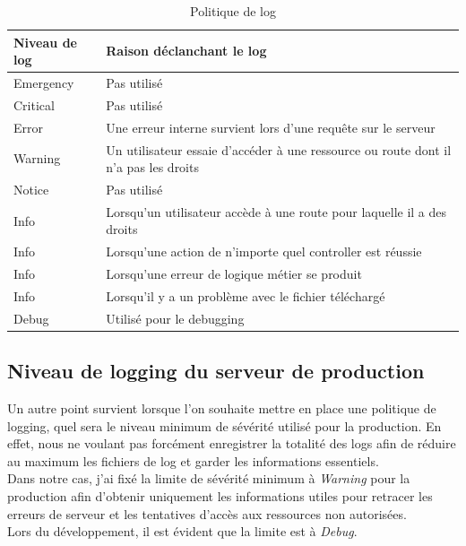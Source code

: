 \documentclass[
    iai, %
    il, %
]{heig-tb}
\begin{document}
\begin{table}[h]
    \begin{center}
        \caption{Politique de log\label{politique-log}}
        \begin{tabularx}{1.0\textwidth} {l|X}
            Niveau de log & Raison déclanchant le log                                                           \\ \hline
            Emergency     & Pas utilisé                                                                         \\
            Critical      & Pas utilisé                                                                         \\
            Error         & Une erreur interne survient lors d'une requête sur le serveur                       \\
            Warning       & Un utilisateur essaie d'accéder à une ressource ou route dont il n'a pas les droits \\
            Notice        & Pas utilisé                                                                         \\
            Info          & Lorsqu'un utilisateur accède à une route pour laquelle il a des droits              \\
            Info          & Lorsqu'une action de n'importe quel controller est réussie                          \\
            Info          & Lorsqu'une erreur de logique métier se produit                                      \\
            Info          & Lorsqu'il y a un problème avec le fichier téléchargé                                \\
            Debug         & Utilisé pour le debugging                                                           \\
        \end{tabularx}
    \end{center}
\end{table}

\subsection{Niveau de logging du serveur de production}
Un autre point survient lorsque l'on souhaite mettre en place une politique de logging, quel sera le niveau minimum de sévérité utilisé pour la production. En effet, nous ne voulant pas forcément enregistrer la totalité des logs afin de réduire au maximum les fichiers de log et garder les informations essentiels. \\
Dans notre cas, j'ai fixé la limite de sévérité minimum à \emph{Warning} pour la production afin d'obtenir uniquement les informations utiles pour retracer les erreurs de serveur et les tentatives d'accès aux ressources non autorisées. \\
Lors du développement, il est évident que la limite est à \emph{Debug}.
\end{document}
